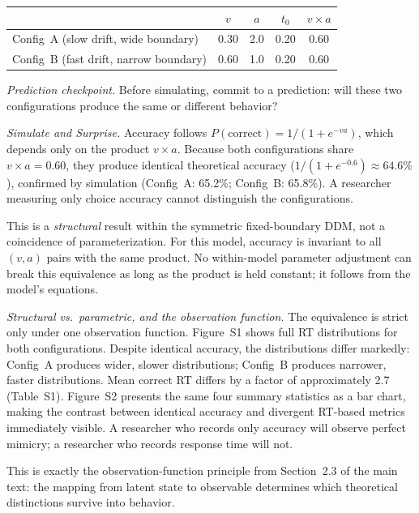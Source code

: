 \documentclass[11pt,a4paper]{article}
\begin{document}
\begin{center}
\begin{tabular}{lcccc}
\toprule
 & $v$ & $a$ & $t_0$ & $v \times a$ \\
\midrule
Config~A (slow drift, wide boundary) & 0.30 & 2.0 & 0.20 & 0.60 \\
Config~B (fast drift, narrow boundary) & 0.60 & 1.0 & 0.20 & 0.60 \\
\bottomrule
\end{tabular}
\end{center}

\emph{Prediction checkpoint.} Before simulating, commit to a prediction: will these two configurations produce the same or different behavior?

\emph{Simulate and Surprise.} Accuracy follows $P(\text{correct}) = 1/(1 + e^{-va})$, which depends only on the product $v \times a$. Because both configurations share $v \times a = 0.60$, they produce identical theoretical accuracy ($1/(1 + e^{-0.6}) \approx 64.6\%$), confirmed by simulation (Config~A: 65.2\%; Config~B: 65.8\%). A researcher measuring only choice accuracy cannot distinguish the configurations.

This is a \emph{structural} result within the symmetric fixed-boundary DDM, not a coincidence of parameterization. For this model, accuracy is invariant to all $(v, a)$ pairs with the same product. No within-model parameter adjustment can break this equivalence as long as the product is held constant; it follows from the model's equations.

\emph{Structural vs.\ parametric, and the observation function.} The equivalence is strict only under one observation function. Figure~S1 shows full RT distributions for both configurations. Despite identical accuracy, the distributions differ markedly: Config~A produces wider, slower distributions; Config~B produces narrower, faster distributions. Mean correct RT differs by a factor of approximately 2.7 (Table~S1). Figure~S2 presents the same four summary statistics as a bar chart, making the contrast between identical accuracy and divergent RT-based metrics immediately visible. A researcher who records only accuracy will observe perfect mimicry; a researcher who records response time will not.

This is exactly the observation-function principle from Section~2.3 of the main text: the mapping from latent state to observable determines which theoretical distinctions survive into behavior.
\end{document}
